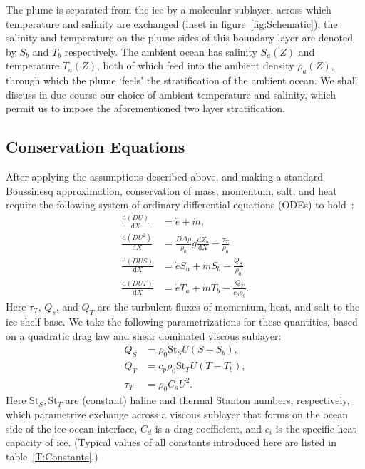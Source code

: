 \documentclass[openacc]{rsproca_new}%
\newcommand{\dd}[2]{\frac{\mathrm{d} #1}{\mathrm{d} #2}}
\begin{document}
The plume is separated from the ice by a molecular sublayer, across which temperature and salinity are exchanged (inset in figure~\ref{fig:Schematic}); the salinity and temperature on the plume sides of this boundary layer are denoted by $S_b$ and $T_b$ respectively. The ambient ocean has salinity $S_a(Z)$ and temperature $T_a(Z)$, both of which feed into the ambient density $\rho_a(Z)$, through which the plume `feels' the stratification of the ambient ocean.  We shall discuss in due course our choice of ambient temperature and salinity, which permit us to impose the aforementioned two layer stratification. 

\subsection{Conservation Equations} 
After applying the assumptions described above, and making a standard Boussinesq approximation, conservation of mass, momentum, salt, and heat require the following system of ordinary differential equations (ODEs) to hold~\citep{Jenkins2011JPhysOcean,Magorrian2016JGeoResOcean}:
\begin{align}
\dd{(DU)}{X} &= \dot{e} + \dot{m},\label{E:Modelling:Model:RawMass}\\
\dd{(DU^2)}{X} &= \frac{D\Delta \rho}{\rho_0} g \dd{Z_b}{X}  -\frac{\tau_T}{\rho_0}\label{E:Modelling:Model:RawMometum}\\
\dd{(DUS)}{X} &= \dot{e}S_a + \dot{m}S_b -\frac{Q_S}{\rho_0}\label{E:Modelling:Model:RawSalt}\\
\dd{(DUT)}{X} &= \dot{e}T_a + \dot{m}T_b -\frac{Q_T}{c_p \rho_0}.\label{E:Modelling:Model:RawTemp}
\end{align}
Here $\tau_T$, $Q_s$, and $Q_T$ are the turbulent fluxes of momentum, heat, and salt to the ice shelf base. We take the following parametrizations for these quantities, based on a quadratic drag law and shear dominated viscous sublayer:
\begin{align}
Q_S &= \rho_0 \mathrm{St}_S U (S - S_b),\label{E:Modelling:Model:TurbulentSalt} \\
Q_T &= c_p \rho_0 \mathrm{St}_T U (T -T_b),\label{E:Modelling:Model:TurbulentHeat}\\
 \tau_T &= \rho_0 C_d U^2.\label{E:Modelling:Model:TurbulentShear}
\end{align}
Here $\mathrm{St}_S, \mathrm{St}_T$ are (constant) haline and thermal Stanton numbers, respectively, which parametrize exchange across a viscous sublayer that forms on the ocean side of the ice-ocean interface, $C_d$ is a drag coefficient, and $c_i$ is the specific heat capacity of ice. (Typical values of all constants introduced here are listed in table~\ref{T:Constants}.)
\end{document}
